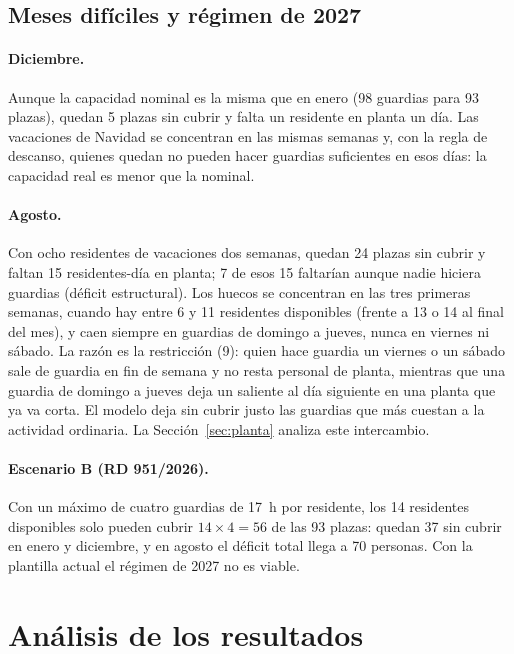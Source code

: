 \subsection{Meses difíciles y régimen de 2027}

\paragraph{Diciembre.} Aunque la capacidad nominal es la misma que en enero (98 guardias para 93 plazas), quedan 5 plazas sin cubrir y falta un residente en planta un día. Las vacaciones de Navidad se concentran en las mismas semanas y, con la regla de descanso, quienes quedan no pueden hacer guardias suficientes en esos días: la capacidad real es menor que la nominal.

\paragraph{Agosto.} Con ocho residentes de vacaciones dos semanas, quedan 24 plazas sin cubrir y faltan 15 residentes-día en planta; 7 de esos 15 faltarían aunque nadie hiciera guardias (déficit estructural). Los huecos se concentran en las tres primeras semanas, cuando hay entre 6 y 11 residentes disponibles (frente a 13 o 14 al final del mes), y caen siempre en guardias de domingo a jueves, nunca en viernes ni sábado. La razón es la restricción (9): quien hace guardia un viernes o un sábado sale de guardia en fin de semana y no resta personal de planta, mientras que una guardia de domingo a jueves deja un saliente al día siguiente en una planta que ya va corta. El modelo deja sin cubrir justo las guardias que más cuestan a la actividad ordinaria. La Sección~\ref{sec:planta} analiza este intercambio.

\paragraph{Escenario B (RD 951/2026).} Con un máximo de cuatro guardias de 17~h por residente, los 14 residentes disponibles solo pueden cubrir $14 \times 4 = 56$ de las 93 plazas: quedan 37 sin cubrir en enero y diciembre, y en agosto el déficit total llega a 70 personas. Con la plantilla actual el régimen de 2027 no es viable.

\section{Análisis de los resultados}
\label{sec:analisis}

